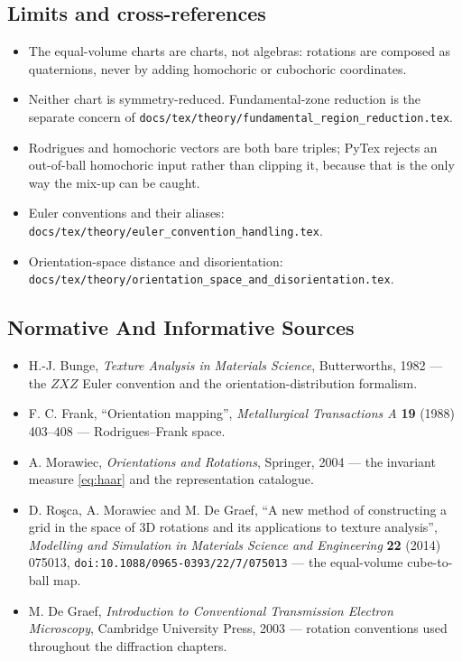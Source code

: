 \subsection{Limits and cross-references}

\begin{itemize}
  \item The equal-volume charts are charts, not algebras: rotations are composed as
        quaternions, never by adding homochoric or cubochoric coordinates.
  \item Neither chart is symmetry-reduced. Fundamental-zone reduction is the separate concern
        of \texttt{docs/tex/theory/fundamental\_region\_reduction.tex}.
  \item Rodrigues and homochoric vectors are both bare triples; PyTex rejects an out-of-ball
        homochoric input rather than clipping it, because that is the only way the mix-up can
        be caught.
  \item Euler conventions and their aliases:
        \texttt{docs/tex/theory/euler\_convention\_handling.tex}.
  \item Orientation-space distance and disorientation:
        \texttt{docs/tex/theory/orientation\_space\_and\_disorientation.tex}.
\end{itemize}

\subsection{Normative And Informative Sources}

\begin{itemize}
  \item H.-J. Bunge, \emph{Texture Analysis in Materials Science}, Butterworths, 1982 --- the
        \(ZXZ\) Euler convention and the orientation-distribution formalism.
  \item F. C. Frank, ``Orientation mapping'', \emph{Metallurgical Transactions A} \textbf{19}
        (1988) 403--408 --- Rodrigues--Frank space.
  \item A. Morawiec, \emph{Orientations and Rotations}, Springer, 2004 --- the invariant
        measure \eqref{eq:haar} and the representation catalogue.
  \item D. Ro\c{s}ca, A. Morawiec and M. De Graef, ``A new method of constructing a grid in the
        space of 3D rotations and its applications to texture analysis'', \emph{Modelling and
        Simulation in Materials Science and Engineering} \textbf{22} (2014) 075013,
        \texttt{doi:10.1088/0965-0393/22/7/075013} --- the equal-volume cube-to-ball map.
  \item M. De Graef, \emph{Introduction to Conventional Transmission Electron Microscopy},
        Cambridge University Press, 2003 --- rotation conventions used throughout the
        diffraction chapters.
\end{itemize}
